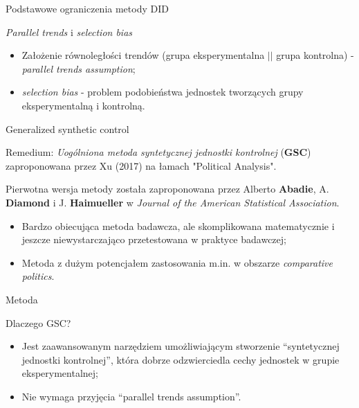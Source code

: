 \documentclass[12pt]{beamer}
\begin{document}
\begin{frame}{Podstawowe ograniczenia metody DID}
    
\begin{block}{\textit{Parallel trends} i \textit{selection bias}}
\begin{itemize}
\item Założenie równoległości trendów (grupa eksperymentalna $||$ grupa kontrolna) - \textit{parallel trends assumption};
\item \textit{selection bias} - problem podobieństwa jednostek tworzących grupy eksperymentalną i kontrolną.
\end{itemize}
\end{block}
    
\end{frame}
   
\begin{frame}{Generalized synthetic control}

\begin{block}{Remedium:}
\textit{Uogólniona metoda syntetycznej jednostki kontrolnej} (\textbf{GSC}) zaproponowana przez Xu (2017) na łamach "Political Analysis".
\end{block}

Pierwotna wersja metody została zaproponowana przez Alberto \textbf{Abadie}, A. \textbf{Diamond} i J. \textbf{Haimueller} w \textit{Journal of the American Statistical Association}.

\begin{itemize}
\item Bardzo obiecująca metoda badawcza, ale skomplikowana matematycznie i jeszcze niewystarczająco przetestowana w praktyce badawczej;
\item Metoda z dużym potencjałem zastosowania m.in. w obszarze \textit{comparative politics}.
\end{itemize}

\end{frame}


\begin{frame}{Metoda}

\begin{block}{Dlaczego GSC?}
\begin{itemize}
\item Jest zaawansowanym narzędziem umożliwiającym stworzenie ``syntetycznej jednostki kontrolnej'', która dobrze odzwierciedla cechy jednostek w grupie eksperymentalnej;
\item Nie wymaga przyjęcia ``parallel trends assumption''.
\end{itemize}
\end{block}

\end{frame}
\end{document}
